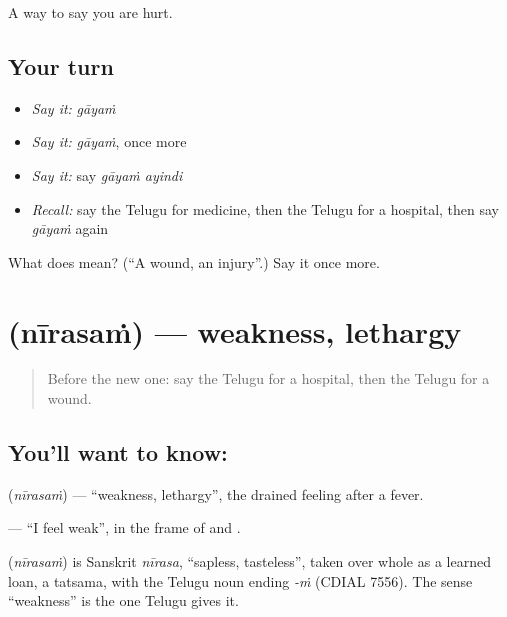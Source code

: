 \begin{grammarlens}[title={What you've built}]
A way to say you are hurt.
\end{grammarlens}

\subsection*{Your turn}
\begin{itemize}
\raggedright
  \item \emph{Say it:} \emph{gāyaṁ}
  \item \emph{Say it:} \emph{gāyaṁ}, once more
  \item \emph{Say it:} say \emph{gāyaṁ ayindi}
  \item \emph{Recall:} say the Telugu for medicine, then the Telugu for a hospital, then say \emph{gāyaṁ} again
\end{itemize}

\begin{tcolorbox}[breakable,colback=teal!4,colframe=teal!35!black,title={Before you move on}]
What does  mean? (\textquotedblleft{}A wound, an injury\textquotedblright{}.) Say it once more.
\end{tcolorbox}
\section[\texorpdfstring{\te{నీరసం} (nīrasaṁ)}{నీరసం (nīrasaṁ)}]{ (nīrasaṁ) — weakness, lethargy}

\label{lesson:TE-C92-weakness}



\begin{quote}
Before the new one: say the Telugu for a hospital, then the Telugu for a wound.
\end{quote}

\subsection*{You'll want to know: }
\textbf{} (\emph{nīrasaṁ}) — \textquotedblleft{}weakness, lethargy\textquotedblright{}, the drained feeling after a fever.

\textbf{  } — \textquotedblleft{}I feel weak\textquotedblright{}, in the frame of \textbf{} and \textbf{}.

\begin{cousinweb}
\textbf{} (\emph{nīrasaṁ}) is Sanskrit \emph{nīrasa}, \textquotedblleft{}sapless, tasteless\textquotedblright{}, taken over whole as a learned loan, a tatsama, with the Telugu noun ending \emph{-ṁ} (CDIAL 7556). The sense \textquotedblleft{}weakness\textquotedblright{} is the one Telugu gives it.
\end{cousinweb}

